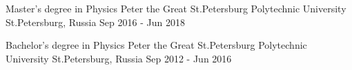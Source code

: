 

\begin{cventries}

  \cventry
    {Master's degree in Physics} %
    {Peter the Great St.Petersburg Polytechnic University} %
    {St.Petersburg, Russia} %
    {Sep 2016 - Jun 2018} %
    {}

  \cventry
    {Bachelor's degree in Physics} %
    {Peter the Great St.Petersburg Polytechnic University} %
    {St.Petersburg, Russia} %
    {Sep 2012 - Jun 2016} %
    {}

\end{cventries}